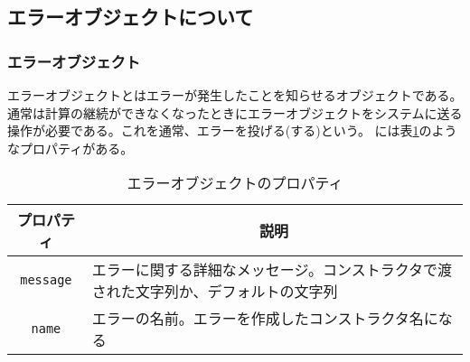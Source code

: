\begin{frame}[containsverbatim]
 \section{エラーオブジェクトについて}
\begin{frame}[containsverbatim]
 \frametitle{エラーオブジェクト}
エラーオブジェクトとはエラーが発生したことを知らせるオブジェクトである。
通常は計算の継続ができなくなったときにエラーオブジェクトをシステムに送る
操作が必要である。これを通常、エラーを投げる(する)という。
には表\ref{ErrorProp}のようなプロパティがある。
\begin{table}[ht]
 \caption{エラーオブジェクトのプロパティ}\label{ErrorProp}
 \begin{center}
	 \begin{tabular}{|c|m{}|}\hline
		プロパティ&\multicolumn{1}{c|}{説明}\\ \hline
		\texttt{message}&エラーに関する詳細なメッセージ。コンストラクタで渡
				された文字列か、デフォルトの文字列\\ \hline
		\texttt{name}&エラーの名前。エラーを作成したコンストラクタ名になる\\ \hline

	\end{tabular}
 \end{center}
\end{table}
\end{frame}

\end{frame}
